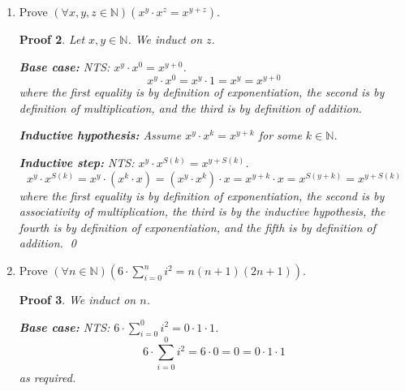 \documentclass[12pt]{article}
\theoremstyle{proofstyle}
\newtheorem*{proof*}{Proof}
\begin{document}
\begin{enumerate}[left=0pt, itemsep=2em, parsep=1em]
\begin{proof*}
    \textbf{Base case:} NTS: $x \cdot 0 = 0 \cdot x$.
    By definition of multiplication, $x \cdot 0 = 0$. By theorem,
    $0 \cdot x = 0$. Hence $x \cdot 0 = 0 \cdot x$.

    \textbf{Inductive hypothesis:} Assume $x \cdot k = k \cdot x$
    for some $k \in \mathbb{N}$.

    \textbf{Inductive step:} NTS: $x \cdot S(k) = S(k) \cdot x$.
    \[
        x \cdot S(k) = (x \cdot k) + x = (k \cdot x) + x = S(k) \cdot x
    \]
    where the first equality is by definition of multiplication, the second
    is by the inductive hypothesis, and the third is by the lemma. \qed
\end{proof*}

\item Prove $(\forall x, y, z \in \mathbb{N})(x^y \cdot x^z = x^{y+z})$.

\begin{proof*}
    Let $x, y \in \mathbb{N}$. We induct on $z$.

    \textbf{Base case:} NTS: $x^y \cdot x^0 = x^{y+0}$.
    \[
        x^y \cdot x^0 = x^y \cdot 1 = x^y = x^{y+0}
    \]
    where the first equality is by definition of exponentiation, the second
    is by definition of multiplication, and the third is by definition of
    addition.

    \textbf{Inductive hypothesis:} Assume $x^y \cdot x^k = x^{y+k}$
    for some $k \in \mathbb{N}$.

    \textbf{Inductive step:} NTS: $x^y \cdot x^{S(k)} = x^{y+S(k)}$.
    \[
        x^y \cdot x^{S(k)} = x^y \cdot (x^k \cdot x) = (x^y \cdot x^k) \cdot x
        = x^{y+k} \cdot x = x^{S(y+k)} = x^{y+S(k)}
    \]
    where the first equality is by definition of exponentiation, the second
    is by associativity of multiplication, the third is by the inductive
    hypothesis, the fourth is by definition of exponentiation, and the fifth
    is by definition of addition. \qed
\end{proof*}

\item Prove $(\forall n \in \mathbb{N})\left(6 \cdot \sum_{i=0}^{n} i^2 = n(n+1)(2n+1)\right)$.

\begin{proof*}
    We induct on $n$.

    \textbf{Base case:} NTS: $6 \cdot \sum_{i=0}^{0} i^2 = 0 \cdot 1 \cdot 1$.
    \[
        6 \cdot \sum_{i=0}^{0} i^2 = 6 \cdot 0 = 0 = 0 \cdot 1 \cdot 1
    \]
    as required.


\end{proof*}
\end{enumerate}
\end{document}
